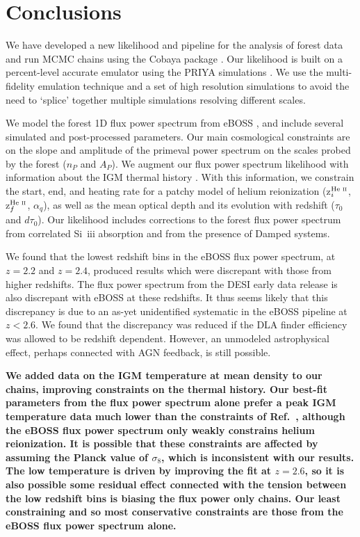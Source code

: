 \section{Conclusions}\label{sec:conclusions}

We have developed a new likelihood and pipeline for the analysis of \Lya forest data and run MCMC chains using the Cobaya package \cite{2021JCAP...05..057T, 2019ascl.soft10019T}.
Our likelihood is built on a percent-level accurate emulator using the PRIYA simulations \cite{2023simsuite}.
We use the multi-fidelity emulation technique \cite{2022MNRAS.517.3200F} and a set of high resolution simulations to avoid the need to `splice' together multiple simulations resolving different scales.

We model the \Lya forest 1D flux power spectrum from eBOSS \cite{2019JCAP...07..017C}, and include several simulated and post-processed parameters.
Our main cosmological constraints are on the slope and amplitude of the primeval power spectrum on the scales probed by the \Lya forest ($n_P$ and $A_P$). 
We augment our \Lya flux power spectrum likelihood with information about the IGM thermal history \cite{2021MNRAS.506.4389G}.
With this information, we constrain the start, end, and heating rate for a patchy model of helium reionization (z$^{\text{He~{\sc ii}}}_i$, z$^{\text{He~{\sc ii}}}_f$, $\alpha_q$), as well as the mean optical depth and its evolution with redshift ($\tau_0$ and $d\tau_0$).
Our likelihood includes corrections to the \lya forest flux power spectrum from correlated Si~{\sc iii} absorption and from the presence of Damped \lya systems.

We found that the lowest redshift bins in the eBOSS flux power spectrum, at $z=2.2$ and $z=2.4$, produced results which were discrepant with those from higher redshifts.
The flux power spectrum from the DESI early data release is also discrepant with eBOSS at these redshifts.
It thus seems likely that this discrepancy is due to an as-yet unidentified systematic in the eBOSS pipeline at $z < 2.6$. We found that the discrepancy was reduced if the DLA finder efficiency was allowed to be redshift dependent. However, an unmodeled astrophysical effect, perhaps connected with AGN feedback, is still possible.  

\textbf{We added data on the IGM temperature at mean density to our chains, improving constraints on the thermal history. Our best-fit parameters from the flux power spectrum alone prefer a peak IGM temperature data much lower than the constraints of Ref.~\cite{2021MNRAS.506.4389G}, although the eBOSS flux power spectrum only weakly constrains helium reionization. It is possible that these constraints are affected by assuming the Planck value of $\sigma_8$, which is inconsistent with our results. The low temperature is driven by improving the fit at $z=2.6$, so it is also possible some residual effect connected with the tension between the low redshift bins is biasing the flux power only chains. Our least constraining and so most conservative constraints are those from the eBOSS flux power spectrum alone.}

